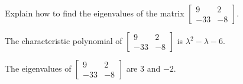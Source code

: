 
\begin{exerciseStatement}


Explain how to find the eigenvalues of the matrix \( \left[\begin{array}{cc}
9 & 2 \\
-33 & -8
\end{array}\right] \).


\end{exerciseStatement}
    
\begin{exerciseAnswer} 


The characteristic polynomial of \( \left[\begin{array}{cc}
9 & 2 \\
-33 & -8
\end{array}\right] \) is \( \lambda^{2} - \lambda - 6 \).



The eigenvalues of \( \left[\begin{array}{cc}
9 & 2 \\
-33 & -8
\end{array}\right] \) are \( 3 \) and \( -2 \).


\end{exerciseAnswer}
    

